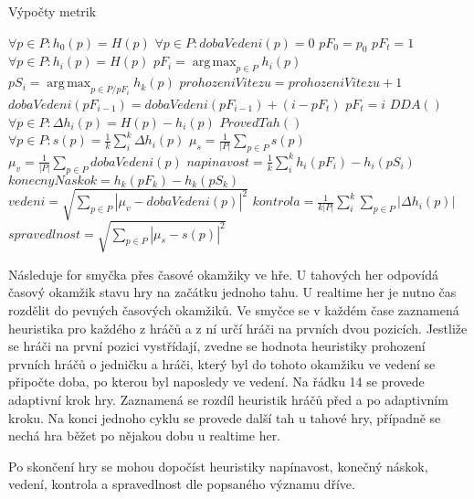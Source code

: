 \begin{algorithm}
\caption{Výpočty metrik}
\label{alg-metrik}
\begin{algorithmic}[1]
\State $\forall p \in P : h_0(p) = H(p)$
\State $\forall p \in P : dobaVedeni(p) = 0$
\State $pF_0 = p_0$
\State $pF_t = 1$
   \State $\forall p \in P : h_i(p) = H(p)$
	 \State $pF_{i}  = \operatorname{arg\,max}_{p \in P} h_{i}(p)$
	 \State $pS_i = \operatorname{arg\,max}_{p \in P / pF_i} h_{k}(p)$
			\State $prohozeniVitezu = prohozeniVitezu + 1$
			\State $dobaVedeni(pF_{i-1}) = dobaVedeni(pF_{i-1}) + (i - pF_t)$
			\State $pF_t = i$
	 \EndIf
	 \State $DDA()$
	 \State $\forall p \in P : \Delta h_i(p) = H(p) - h_i(p)$
	 \State $ProvedTah()$
\EndFor
\State $\forall p \in P : s(p) = \frac{1}{k}\sum_i^k \Delta h_i(p)$
\State $\mu_s = \frac{1}{|P|}\sum_{p \in P} s(p)$
\State $\mu_v = \frac{1}{|P|}\sum_{p \in P} dobaVedeni(p)$
\State $napinavost = \frac{1}{k}\sum_i^k{h_i(pF_i) - h_i(pS_i)}$ 
\State $konecnyNaskok = h_k(pF_k) - h_k(pS_k)$
\State $vedeni = \sqrt{\sum_{p \in P} |\mu_v - dobaVedeni(p)|^2}$
\State $kontrola = \frac{1}{k |P|}\sum_i^k{\sum_{p \in P} |\Delta h_i(p)|}$
\State $spravedlnost = \sqrt{\sum_{p \in P} |\mu_s - s(p)|^2}$
\end{algorithmic}
\end{algorithm}

Následuje for smyčka přes časové okamžiky ve hře. U tahových her odpovídá časový okamžik stavu hry na začátku jednoho tahu. U realtime her je nutno čas rozdělit do pevných časových okamžiků. Ve smyčce se v každém čase zaznamená heuristika pro každého z hráčů a z ní určí hráči na prvních dvou pozicích. Jestliže se hráči na první pozici vystřídají, zvedne se hodnota heuristiky prohození prvních hráčů o jedničku a hráči, který byl do tohoto okamžiku ve vedení se připočte doba, po kterou byl naposledy ve vedení. Na řádku 14 se provede adaptivní krok hry. Zaznamená se rozdíl heuristik hráčů před a po adaptivním kroku. Na konci jednoho cyklu se provede další tah u tahové hry, případně se nechá hra běžet po nějakou dobu u realtime her.

Po skončení hry se mohou dopočíst heuristiky napínavost, konečný náskok, vedení, kontrola a spravedlnost dle popsaného významu dříve.


